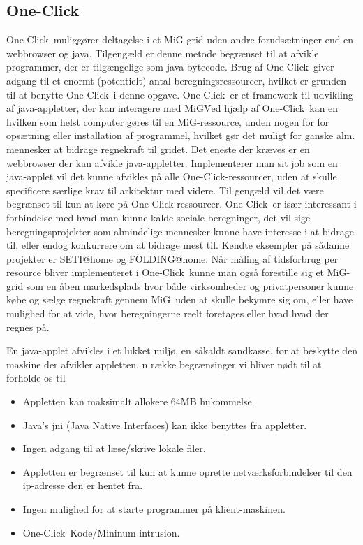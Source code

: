 \documentclass[draft,a4paper,10pt]{article}
\newcommand{\mig}{MiG}
\newcommand{\oc}{One-Click}
\begin{document}
\subsection{\oc}\label{applet}
\oc\ muliggører deltagelse i et \mig-grid uden andre forudsætninger end en webbrowser og java. Tilgengæld er denne metode begrænset til at afvikle programmer, der er tilgængelige som java-bytecode. Brug af \oc\ giver adgang til et enormt (potentielt) antal beregningsressourcer, hvilket er grunden til at benytte \oc\ i denne opgave.
\oc\ er et framework til udvikling af java-appletter, der kan interagere med \mig\. Ved hjælp af \oc\ kan en hvilken som helst computer gøres til en \mig-ressource, unden nogen for for opsætning eller installation af programmel, hvilket gør det muligt for ganske alm. mennesker at bidrage regnekraft til gridet. Det eneste der kræves er en webbrowser der kan afvikle java-appletter. Implementerer man sit job som en java-applet vil det kunne afvikles på alle \oc-ressourcer, uden at skulle specificere særlige krav til arkitektur med videre. Til gengæld vil det være begrænset til kun at køre på \oc-ressourcer. 
\oc\ er især interessant i forbindelse med hvad man kunne kalde sociale beregninger, det vil sige beregningsprojekter som almindelige mennesker kunne have interesse i at bidrage til, eller endog konkurrere om at bidrage mest til. Kendte eksempler på sådanne projekter er SETI@home og FOLDING@home. Når måling af tidsforbrug per resource bliver implementeret i \oc\ kunne man også  forestille sig et \mig-grid som en åben markedsplads hvor både virksomheder og privatpersoner kunne købe og sælge regnekraft gennem \mig\ uden at skulle bekymre sig om, eller have mulighed for at vide, hvor beregningerne reelt foretages eller hvad hvad der regnes på. 


En java-applet afvikles i et lukket miljø, en såkaldt sandkasse, for at beskytte den maskine der afvikler appletten. n række begrænsinger vi bliver nødt til at forholde os til
\begin{itemize}
	\item Appletten kan maksimalt allokere 64MB hukommelse.
	\item Java's jni (Java Native Interfaces) kan ikke benyttes fra appletter. 
	\item Ingen adgang til at læse/skrive lokale filer.
	\item Appletten er begrænset til kun at kunne oprette netværksforbindelser til den ip-adresse den er hentet fra.
	\item Ingen mulighed for at starte programmer på klient-maskinen.
	\item \oc\ Kode/Mininum intrusion.
\end{itemize}
\end{document}
